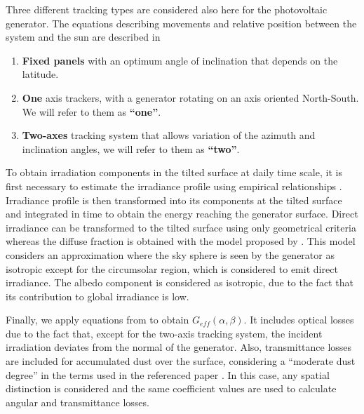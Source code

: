 
Three different tracking types are considered also here for the photovoltaic generator. The equations describing movements and relative position between the system and the sun are described in \cite{Perpinan2009}

\begin{enumerate}
\item \textbf{Fixed panels} with an optimum angle of inclination that depends on the latitude.
\item \textbf{One} axis trackers, with a generator rotating on an axis oriented North-South. We will refer to them as \textbf{“one”}.
\item \textbf{Two-axes} tracking system that allows variation of the azimuth and inclination angles, we will refer to them as \textbf{“two”}.
\end{enumerate}

To obtain irradiation components in the tilted surface at daily time scale, it is first necessary to estimate the irradiance profile using empirical relationships \cite*{Collares-Pereira1979}. Irradiance profile is then transformed into its components at the tilted surface and integrated in time to obtain the energy reaching the generator surface. Direct irradiance can be transformed to the tilted surface using only geometrical criteria whereas the diffuse fraction is obtained with the model proposed by \cite{hay1985estimating}. This model considers an approximation where the sky sphere is seen by the generator as isotropic except for the circumsolar region, which is considered to emit direct irradiance. The albedo component is considered as isotropic, due to the fact that its contribution to global irradiance is low. 

Finally, we apply equations from \cite{Martin2001} to obtain $G_{eff}(\alpha, \beta)$. It includes optical losses due to the fact that, except for the two-axis tracking system, the incident irradiation deviates from the normal of the generator. Also, transmittance losses are included for accumulated dust over the surface, considering a ``moderate dust degree'' in the terms used in the referenced paper \cite{Martin2001}. In this case, any spatial distinction is considered and the same coefficient values are used to calculate angular and transmittance losses. 

